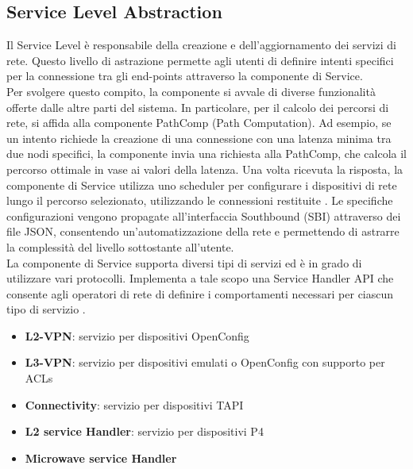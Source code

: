 \subsection{Service Level Abstraction}
Il Service Level è responsabile della creazione e dell'aggiornamento dei servizi di rete.
Questo livello di astrazione permette agli utenti di definire intenti specifici per la connessione tra gli end-points attraverso la componente di Service.
\\Per svolgere questo compito, la componente si avvale di diverse funzionalità offerte dalle altre parti del sistema.
In particolare, per il calcolo dei percorsi di rete, si affida alla componente PathComp (Path Computation).
Ad esempio, se un intento richiede la creazione di una connessione con una latenza minima tra due nodi specifici, 
la componente invia una richiesta alla PathComp, che calcola il percorso ottimale in vase ai valori della latenza.
Una volta ricevuta la risposta, la componente di Service utilizza uno scheduler per configurare i dispositivi di rete lungo il percorso selezionato, utilizzando le connessioni restituite \cite{D32}. %
Le specifiche configurazioni vengono propagate all'interfaccia Southbound (SBI) attraverso dei file JSON, consentendo un'automatizzazione della rete e permettendo di astrarre la complessità del livello sottostante all'utente.
\\La componente di Service supporta diversi tipi di servizi ed è in grado di utilizzare vari protocolli.
Implementa a tale scopo una Service Handler API che consente agli operatori di rete di definire i comportamenti necessari per ciascun tipo di servizio \cite{D32}.
\begin{itemize}
    \item \textbf{L2-VPN}: servizio per dispositivi OpenConfig
    \item \textbf{L3-VPN}: servizio per dispositivi emulati o OpenConfig con supporto per ACLs
    \item \textbf{Connectivity}: servizio per dispositivi TAPI
    \item \textbf{L2 service Handler}: servizio per dispositivi P4
    \item \textbf{Microwave service Handler}
\end{itemize}
